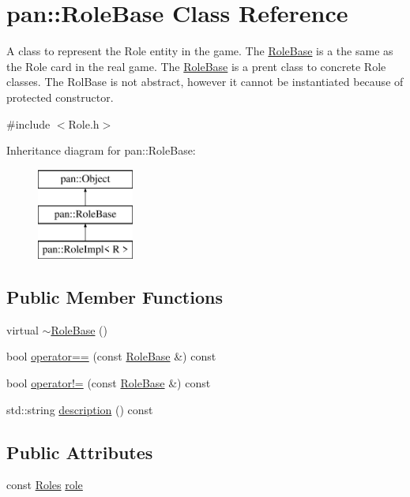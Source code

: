 \hypertarget{classpan_1_1_role_base}{}\section{pan\+:\+:Role\+Base Class Reference}
\label{classpan_1_1_role_base}


A class to represent the Role entity in the game. The \hyperlink{classpan_1_1_role_base}{Role\+Base} is a the same as the Role card in the real game. The \hyperlink{classpan_1_1_role_base}{Role\+Base} is a prent class to concrete Role classes. The Rol\+Base is not abstract, however it cannot be instantiated because of protected constructor.  




{\ttfamily \#include $<$Role.\+h$>$}

Inheritance diagram for pan\+:\+:Role\+Base\+:\begin{figure}[H]
\begin{center}
\leavevmode
\includegraphics[height=3.000000cm]{classpan_1_1_role_base}
\end{center}
\end{figure}
\subsection*{Public Member Functions}
\begin{DoxyCompactItemize}
\item 
virtual \hyperlink{classpan_1_1_role_base_a6573ddc4f609c21035b7d0e383a01ba8}{$\sim$\+Role\+Base} ()
\item 
bool \hyperlink{classpan_1_1_role_base_aa92715dd7056ec28fa2e6be60c5f8ab5}{operator==} (const \hyperlink{classpan_1_1_role_base}{Role\+Base} \&) const
\item 
bool \hyperlink{classpan_1_1_role_base_a1d3a036dfc74bb7e3a6b9fcdbaaf3ef0}{operator!=} (const \hyperlink{classpan_1_1_role_base}{Role\+Base} \&) const
\item 
std\+::string \hyperlink{classpan_1_1_role_base_a6f4774e52750478d865c4627fc4d4460}{description} () const
\end{DoxyCompactItemize}
\subsection*{Public Attributes}
\begin{DoxyCompactItemize}
\item 
const \hyperlink{namespacepan_a5017f84fa51152eae453759537d1ced6}{Roles} \hyperlink{classpan_1_1_role_base_a1da6d8a75410162b2fc40f05a0b594c9}{role}
\end{DoxyCompactItemize}
